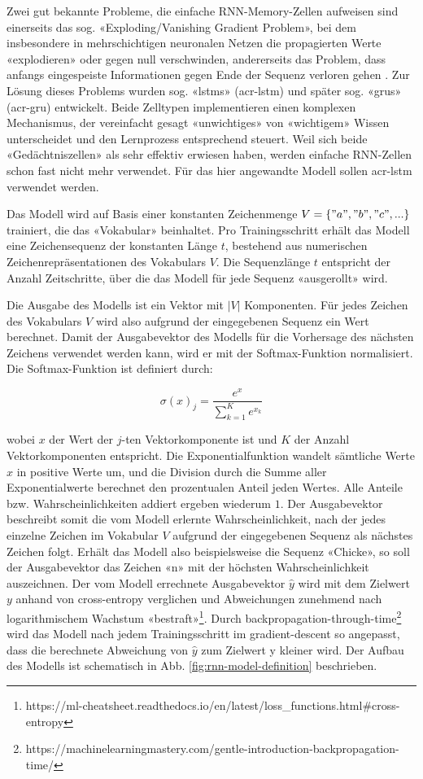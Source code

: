 Zwei gut bekannte Probleme, die einfache RNN-Memory-Zellen aufweisen sind einerseits das sog. «Exploding/Vanishing Gradient Problem», bei dem insbesondere in mehrschichtigen neuronalen Netzen
die propagierten Werte «explodieren» oder gegen null verschwinden, andererseits das Problem, dass anfangs eingespeiste Informationen gegen Ende der Sequenz verloren gehen \autocite{geron}.
Zur Lösung dieses Problems wurden sog. «\glspl{lstm}» (\acrshort{acr-lstm})\autocite{lstm} und später sog. «\glspl{gru}» (\acrshort{acr-gru})\autocite{gru} entwickelt.
Beide Zelltypen implementieren einen komplexen Mechanismus, der vereinfacht gesagt «unwichtiges» von «wichtigem» Wissen unterscheidet und den Lernprozess entsprechend steuert.
Weil sich beide «Gedächtniszellen» als sehr effektiv erwiesen haben, werden einfache RNN-Zellen schon fast nicht mehr verwendet.
Für das hier angewandte Modell sollen \acrshort{acr-lstm} verwendet werden.

Das Modell wird auf Basis einer konstanten Zeichenmenge $ V = \{ "a", "b", "c", ...\} $ trainiert, die das «Vokabular» beinhaltet.
Pro Trainingsschritt erhält das Modell eine Zeichensequenz der konstanten Länge $ t $, bestehend aus numerischen Zeichenrepräsentationen des Vokabulars $ V $.
Die Sequenzlänge $ t $ entspricht der Anzahl Zeitschritte, über die das Modell für jede Sequenz «ausgerollt» wird.

Die Ausgabe des Modells ist ein Vektor mit $ |V| $ Komponenten.
Für jedes Zeichen des Vokabulars $ V $ wird also aufgrund der eingegebenen Sequenz ein Wert berechnet.
Damit der Ausgabevektor des Modells für die Vorhersage des nächsten Zeichens verwendet werden kann, wird er mit der Softmax-Funktion normalisiert.
Die Softmax-Funktion ist definiert durch:

\[ \sigma(x)_{j} = \frac{e^{x}}{\sum_{k=1}^{K} e^{x_{k}}} \]

wobei $ x $ der Wert der $ j $-ten Vektorkomponente ist und $ K $ der Anzahl Vektorkomponenten entspricht.
Die Exponentialfunktion wandelt sämtliche Werte $ x $ in positive Werte um, und die Division durch die Summe aller Exponentialwerte berechnet den prozentualen Anteil jeden Wertes.
Alle Anteile bzw. Wahrscheinlichkeiten addiert ergeben wiederum $ 1 $.
Der Ausgabevektor beschreibt somit die vom Modell erlernte Wahrscheinlichkeit, nach der jedes einzelne Zeichen im Vokabular $ V $ aufgrund der eingegebenen Sequenz als nächstes Zeichen folgt.
Erhält das Modell also beispielsweise die Sequenz «Chicke», so soll der Ausgabevektor das Zeichen «n» mit der höchsten Wahrscheinlichkeit auszeichnen.
Der vom Modell errechnete Ausgabevektor $ \hat{y} $ wird mit dem Zielwert $ y $ anhand von \gls{cross-entropy} verglichen und
Abweichungen zunehmend nach logarithmischem Wachstum «bestraft»\footnote{https://ml-cheatsheet.readthedocs.io/en/latest/loss\_functions.html#cross-entropy}.
Durch \gls{backpropagation-through-time}\footnote{https://machinelearningmastery.com/gentle-introduction-backpropagation-time/} wird das Modell nach jedem Trainingsschritt im \gls{gradient-descent}
so angepasst, dass die berechnete Abweichung von $ \hat{y} $ zum Zielwert y kleiner wird.
Der Aufbau des Modells ist schematisch in Abb. \ref{fig:rnn-model-definition} beschrieben.

